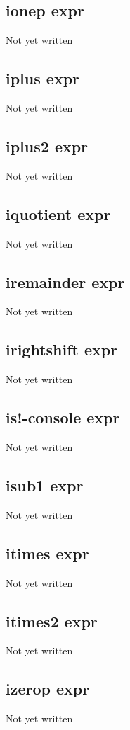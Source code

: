 \documentclass[a4paper,11pt]{article}
\begin{document}
\subsection{\ttfamily ionep expr}
Not yet written

\subsection{\ttfamily iplus expr}
Not yet written

\subsection{\ttfamily iplus2 expr}
Not yet written

\subsection{\ttfamily iquotient expr}
Not yet written

\subsection{\ttfamily iremainder expr}
Not yet written

\subsection{\ttfamily irightshift expr}
Not yet written

\subsection{\ttfamily is!-console expr}
Not yet written

\subsection{\ttfamily isub1 expr}
Not yet written

\subsection{\ttfamily itimes expr}
Not yet written

\subsection{\ttfamily itimes2 expr}
Not yet written

\subsection{\ttfamily izerop expr}
Not yet written
\end{document}
